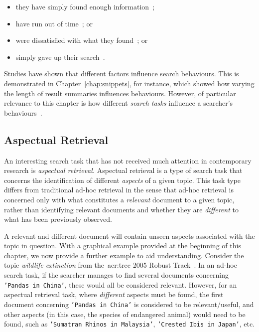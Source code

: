 \begin{itemize}
    \item{they have simply found enough information~\citep{prabha2007enough, dostert2009satisficing, hassan2013beyond_clicks};}
    \item{have run out of time~\citep{zach2005enough_is_enough}; or}
    \item{were dissatisfied with what they found~\citep{kiseleva2015serp_fails}; or}
    \item{simply gave up their search~\citep{diriye2012abandonment}.}
\end{itemize}

Studies have shown that different factors influence search behaviours. This is demonstrated in Chapter~\ref{chap:snippets}, for instance, which showed how varying the length of result summaries influences behaviours. However, of particular relevance to this chapter is how different \emph{search tasks} influence a searcher's behaviours~\citep{kelly2015search_tasks}.

\subsection{Aspectual Retrieval}
An interesting search task that has not received much attention in contemporary research is \emph{aspectual retrieval.} Aspectual retrieval is a type of search task that concerns the identification of different \emph{aspects} of a given topic. This task type differs from traditional ad-hoc retrieval in the sense that ad-hoc retrieval is concerned only with what constitutes a \emph{relevant} document to a given topic, rather than identifying relevant documents and whether they are \emph{different} to what has been previously observed.

A relevant and different document will contain unseen aspects associated with the topic in question. With a graphical example provided at the beginning of this chapter, we now provide a further example to aid understanding. Consider the topic \emph{wildlife extinction} from the~\gls{acr:trec} 2005 Robust Track~\citep{voorhees2006trec_robust}. In an ad-hoc search task, if the searcher manages to find several documents concerning \texttt{'Pandas in China'}, these would all be considered relevant. However, for an aspectual retrieval task, where \emph{different} aspects must be found, the first document concerning \texttt{'Pandas in China'} is considered to be relevant/useful, and other aspects (in this case, the species of endangered animal) would need to be found, such as \texttt{'Sumatran Rhinos in Malaysia'}, \texttt{'Crested Ibis in Japan'}, etc.

